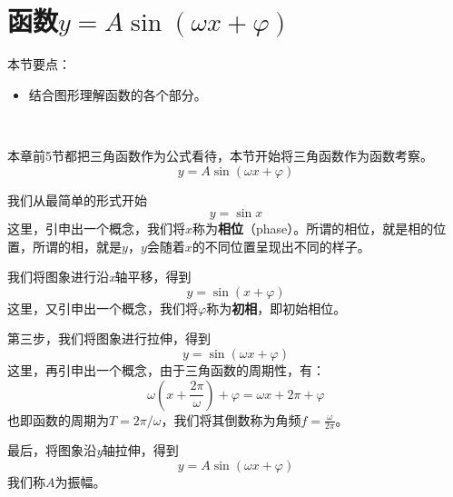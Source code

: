 \section{函数\texorpdfstring{$y=A\sin \left( \omega x+\varphi \right) $}\ }

本节要点：
\begin{itemize}
    \item 结合图形理解函数的各个部分。
\end{itemize}

~

本章前5节都把三角函数作为公式看待，本节开始将三角函数作为函数考察。
\[
y=A\sin \left( \omega x+\varphi \right)
\]

我们从最简单的形式开始
\[
y=\sin x
\]
这里，引申出一个概念，我们将$x$称为{\bf 相位}（phase）。所谓的相位，就是相的位置，所谓的相，就是$y$，$y$会随着$x$的不同位置呈现出不同的样子。

我们将图象进行沿{\it x}轴平移，得到
\[
y=\sin \left( x+\varphi \right)
\]
这里，又引申出一个概念，我们将$\varphi $称为{\bf 初相}，即初始相位。

第三步，我们将图象进行拉伸，得到
\[
y=\sin \left( \omega x+\varphi \right)
\]
这里，再引申出一个概念，由于三角函数的周期性，有：
\[
\omega \left( x+\frac{2\pi}{\omega} \right) +\varphi =\omega x+2\pi +\varphi
\]
也即函数的周期为$T=2\pi /\omega $，我们将其倒数称为角频$f=\frac{\omega}{2\pi}$。

最后，将图象沿{\it y}轴拉伸，得到
\[
y=A\sin \left( \omega x+\varphi \right)
\]
我们称$A$为振幅。




